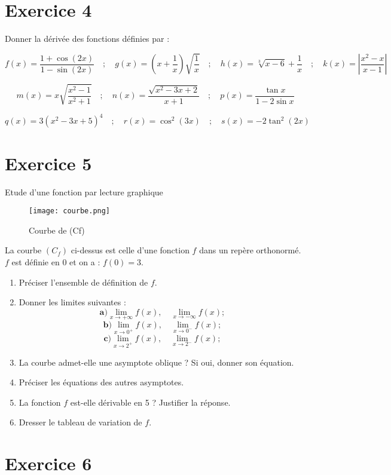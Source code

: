 \documentclass[12pt]{article}
\begin{document}
\section*{Exercice 4}


Donner la dérivée des fonctions définies par :

\[
f(x) = \frac{1 + \cos(2x)}{1 - \sin(2x)} \quad ; \quad
g(x) = \left( x + \frac{1}{x} \right) \sqrt{\frac{1}{x}} \quad ; \quad
h(x) = \sqrt[3]{x - 6} + \frac{1}{x} \quad ; \quad
k(x) = \left| \frac{x^2 - x}{x - 1} \right|
\]

\[
m(x) = x \sqrt{\frac{x^2 - 1}{x^2 + 1}} \quad ; \quad
n(x) = \frac{\sqrt{x^2 - 3x + 2}}{x + 1} \quad ; \quad
p(x) = \frac{\tan x}{1 - 2 \sin x}
\]

\[
q(x) = 3 \left( x^2 - 3x + 5 \right)^4 \quad ; \quad
r(x) = \cos^2(3x) \quad ; \quad
s(x) = -2 \tan^2(2x)
\]
\newpage
\section*{Exercice 5}
Etude d'une fonction par lecture graphique
\begin{figure}[h]
\centering
\texttt{[image: courbe.png]}
\caption{Courbe de (Cf)}
\label{fig:monimage}
\end{figure}
La courbe $(C_f)$ ci-dessus est celle d'une fonction $f$ dans un repère orthonormé. $f$ est définie en 0 et on a : $f(0) = 3$.

\begin{enumerate}
    \item Préciser l'ensemble de définition de $f$.
    \item Donner les limites suivantes :
    \[
    \textbf{a)} \lim_{x \to +\infty} f(x), \quad \lim_{x \to -\infty} f(x) ;
    \]
    \[
    \textbf{b)} \lim_{x \to 0^+} f(x), \quad \lim_{x \to 0^-} f(x) ;
    \]
    \[
    \textbf{c)} \lim_{x \to 2^+} f(x), \quad \lim_{x \to 2^-} f(x) ;
    \]
    \item La courbe admet-elle une asymptote oblique ? Si oui, donner son équation.
    \item Préciser les équations des autres asymptotes.
    \item La fonction $f$ est-elle dérivable en 5 ? Justifier la réponse.
    \item Dresser le tableau de variation de $f$.
\end{enumerate}

\section*{Exercice 6}
\end{document}
